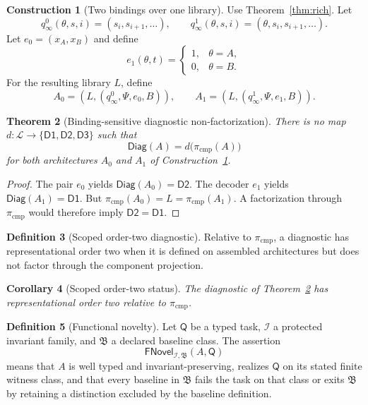 \documentclass[11pt]{article}
\newcommand{\Tail}{\ensuremath{\Psi}}
\newcommand{\Diag}{\ensuremath{\mathsf{Diag}}}
\newcommand{\DOne}{\ensuremath{\mathsf{D1}}}
\newcommand{\DTwo}{\ensuremath{\mathsf{D2}}}
\newcommand{\DThree}{\ensuremath{\mathsf{D3}}}
\newcommand{\Lib}{\ensuremath{\mathcal L}}
\newcommand{\Inv}{\ensuremath{\mathcal I}}
\newcommand{\FNovel}{\ensuremath{\mathsf{FNovel}}}
\newcommand{\Base}{\ensuremath{\mathfrak B}}
\newcommand{\Task}{\ensuremath{\mathsf Q}}
\theoremstyle{plain}
\newtheorem{theorem}{Theorem}[section]
\newtheorem{corollary}[theorem]{Corollary}
\theoremstyle{definition}
\newtheorem{definition}[theorem]{Definition}
\newtheorem{construction}[theorem]{Construction}
\theoremstyle{remark}
\begin{document}
\begin{construction}[Two bindings over one library]
\label{con:bindings}
Use Theorem~\ref{thm:rich}.  Let
\[
q^0_\infty(\theta,s,i)=(s_i,s_{i+1},\ldots),
\qquad
q^1_\infty(\theta,s,i)=(\theta,s_i,s_{i+1},\ldots).
\]
Let $e_0=(x_A,x_B)$ and define
\[
e_1(\theta,t)=
\begin{cases}1,&\theta=A,\\0,&\theta=B.\end{cases}
\]
For the resulting library $L$, define
\[
A_0=(L,(q^0_\infty,\Tail,e_0,B)),\qquad
A_1=(L,(q^1_\infty,\Tail,e_1,B)).
\]
\end{construction}

\begin{theorem}[Binding-sensitive diagnostic non-factorization]
\label{thm:binding}
There is no map $d:\Lib\to\{\DOne,\DTwo,\DThree\}$ such that
\[
\Diag(A)=d\bigl(\pi_{\mathrm{cmp}}(A)\bigr)
\]
for both architectures $A_0$ and $A_1$ of Construction~\ref{con:bindings}.
\end{theorem}

\begin{proof}
The pair $e_0$ yields $\Diag(A_0)=\DTwo$.  The decoder $e_1$ yields
$\Diag(A_1)=\DOne$.  But
$\pi_{\mathrm{cmp}}(A_0)=L=\pi_{\mathrm{cmp}}(A_1)$.  A factorization through
$\pi_{\mathrm{cmp}}$ would therefore imply $\DTwo=\DOne$.
\end{proof}

\begin{definition}[Scoped order-two diagnostic]
Relative to $\pi_{\mathrm{cmp}}$, a diagnostic has representational order two
when it is defined on assembled architectures but does not factor through the
component projection.
\end{definition}

\begin{corollary}[Scoped order-two status]
The diagnostic of Theorem~\ref{thm:binding} has representational order two
relative to $\pi_{\mathrm{cmp}}$.
\end{corollary}

\begin{definition}[Functional novelty]
Let $\Task$ be a typed task, $\Inv$ a protected invariant family, and
$\Base$ a declared baseline class.  The assertion
\[
\FNovel_{\Inv,\Base}(A,\Task)
\]
means that $A$ is well typed and invariant-preserving, realizes $\Task$ on its
stated finite witness class, and that every baseline in $\Base$ fails the task
on that class or exits $\Base$ by retaining a distinction excluded by the
baseline definition.
\end{definition}
\end{document}

